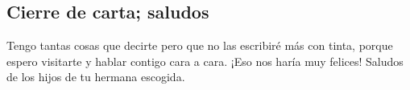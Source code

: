\hypertarget{cierre-de-carta-saludos}{%
\subsection{Cierre de carta; saludos}\label{cierre-de-carta-saludos}}

 Tengo tantas cosas que decirte pero que no las escribiré
más con tinta, porque espero visitarte y hablar contigo cara a cara.
¡Eso nos haría muy felices!  Saludos de los hijos de tu
hermana escogida.
